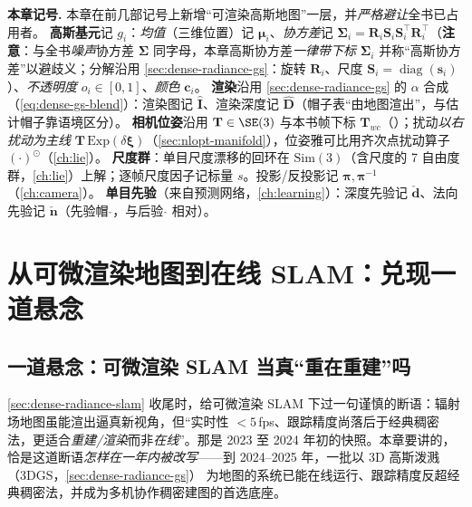 \begin{note}
\textbf{本章记号.}\;
本章在前几部记号上新增“可渲染高斯地图”一层，并\emph{严格避让}全书已占用者。
\textbf{高斯基元}记 $g_i$：\emph{均值}（三维位置）记 $\boldsymbol\mu_i$、\emph{协方差}记 $\boldsymbol\Sigma_i=\mathbf{R}_i\mathbf{S}_i\mathbf{S}_i^\top\mathbf{R}_i^\top$（\textbf{注意}：与全书\emph{噪声}协方差 $\boldsymbol\Sigma$ 同字母，本章高斯协方差\emph{一律带下标} $\boldsymbol\Sigma_i$ 并称“高斯协方差”以避歧义；分解沿用 \cref{sec:dense-radiance-gs}：旋转 $\mathbf{R}_i$、尺度 $\mathbf{S}_i=\operatorname{diag}(\mathbf{s}_i)$）、\emph{不透明度} $o_i\in[0,1]$、\emph{颜色} $\mathbf{c}_i$。
\textbf{渲染}沿用 \cref{sec:dense-radiance-gs} 的 $\alpha$ 合成（\cref{eq:dense-gs-blend}）：渲染图记 $\hat{\mathbf{I}}$、渲染深度记 $\hat{\mathbf{D}}$（帽子表“由地图渲出”，与估计帽子靠语境区分）。
\textbf{相机位姿}沿用 $\mathbf{T}\in\SE(3)$ 与本书帧下标 $\mathbf{T}_{wc}$（）；扰动\emph{以右扰动为主线} $\mathbf{T}\,\mathrm{Exp}(\delta\boldsymbol\xi)$（\cref{sec:nlopt-manifold}），位姿雅可比用齐次点扰动算子 $(\cdot)^\odot$（\cref{ch:lie}）。
\textbf{尺度群}：单目尺度漂移的回环在 $\mathrm{Sim}(3)$（含尺度的 7 自由度群，\cref{ch:lie}）上解；逐帧尺度因子记标量 $s$。投影/反投影记 $\boldsymbol\pi,\boldsymbol\pi^{-1}$（\cref{ch:camera}）。
\textbf{单目先验}（来自预测网络，\cref{ch:learning}）：深度先验记 $\check{\mathbf{d}}$、法向先验记 $\check{\mathbf{n}}$（先验帽 $\check{}$，与后验 $\hat{}$ 相对）。
\end{note}

\section{从可微渲染地图到在线 SLAM：兑现一道悬念}
\label{sec:gs-online}

\subsection{一道悬念：可微渲染 SLAM 当真“重在重建”吗}

\cref{sec:dense-radiance-slam} 收尾时，给可微渲染 SLAM 下过一句谨慎的断语：辐射场地图虽能渲出逼真新视角，但“实时性 $<5$\,fps、跟踪精度尚落后于经典稠密法，更适合\emph{重建/渲染}而非\emph{在线}”。那是 2023 至 2024 年初的快照。本章要讲的，恰是这道断语\emph{怎样在一年内被改写}——到 2024–2025 年，一批以 3D 高斯泼溅（3DGS，\cref{sec:dense-radiance-gs}）\cite{kerbl2023gaussian} 为地图的系统已能在线运行、跟踪精度反超经典稠密法，并成为多机协作稠密建图的首选底座。

